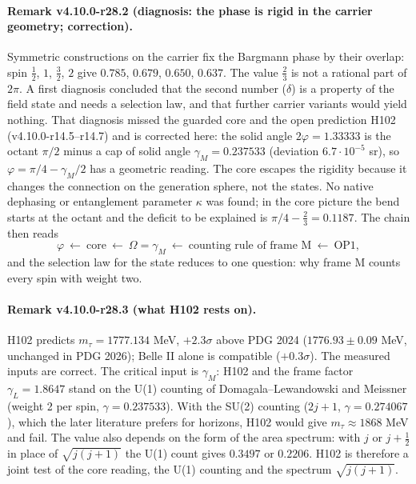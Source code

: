 \paragraph{Remark v4.10.0-r28.2 (diagnosis: the phase is rigid in the carrier geometry; correction).}
Symmetric constructions on the carrier fix the Bargmann phase by their overlap: spin \(\tfrac12\), \(1\), \(\tfrac32\), \(2\) give
\(0.785\), \(0.679\), \(0.650\), \(0.637\).  The value \(\tfrac23\) is not a rational part of \(2\pi\).  A first diagnosis concluded that the
second number (\(\delta\)) is a property of the field state and needs a selection law, and that further carrier variants would yield nothing.
That diagnosis missed the guarded core and the open prediction H102 (v4.10.0-r14.5--r14.7) and is corrected here: the solid angle
\(2\varphi=1.33333\) is the octant \(\pi/2\) minus a cap of solid angle \(\gamma_M=0.237533\) (deviation \(6.7\cdot10^{-5}\) sr), so
\(\varphi=\pi/4-\gamma_M/2\) has a geometric reading.  The core escapes the rigidity because it changes the connection on the generation
sphere, not the states.  No native dephasing or entanglement parameter \(\kappa\) was found; in the core picture the bend starts at the
octant and the deficit to be explained is \(\pi/4-\tfrac23=0.1187\).  The chain then reads
\[
\varphi\ \leftarrow\ \text{core}\ \leftarrow\ \Omega=\gamma_M\ \leftarrow\ \text{counting rule of frame M}\ \leftarrow\ \text{OP1},
\]
and the selection law for the state reduces to one question: why frame M counts every spin with weight two.

\paragraph{Remark v4.10.0-r28.3 (what H102 rests on).}
H102 predicts \(m_\tau=1777.134\) MeV, \(+2.3\sigma\) above PDG 2024 (\(1776.93\pm0.09\) MeV, unchanged in PDG 2026); Belle II alone is
compatible (\(+0.3\sigma\)).  The measured inputs are correct.  The critical input is \(\gamma_M\): H102 and the frame factor
\(\gamma_L=1.8647\) stand on the U(1) counting of Domagala--Lewandowski and Meissner (weight 2 per spin, \(\gamma=0.237533\)).  With the
SU(2) counting (\(2j+1\), \(\gamma=0.274067\)), which the later literature prefers for horizons, H102 would give \(m_\tau\approx1868\) MeV and
fail.  The value also depends on the form of the area spectrum: with \(j\) or \(j+\tfrac12\) in place of \(\sqrt{j(j+1)}\) the U(1) count
gives \(0.3497\) or \(0.2206\).  H102 is therefore a joint test of the core reading, the U(1) counting and the spectrum \(\sqrt{j(j+1)}\).

